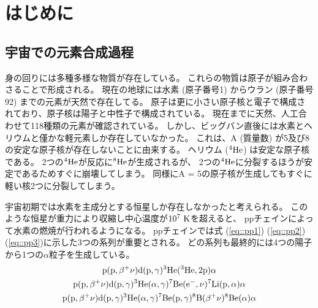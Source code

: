 \chapter{はじめに}
\section{宇宙での元素合成過程}
\label{seq::nucleaosynthesis}
身の回りには多種多様な物質が存在している。
これらの物質は原子が組み合わさることで形成される。
現在の地球には水素 (原子番号1) からウラン (原子番号92) までの元素が天然で存在してる。
原子は更に小さい原子核と電子で構成されており、原子核は陽子と中性子で構成されている。
現在までに天然、人工合わせて118種類の元素が確認されている。
しかし、ビッグバン直後には水素とヘリウムと僅かな軽元素しか存在していなかった。
これは、A (質量数) が5及び8の安定な原子核が存在しないことに由来する。
ヘリウム (${}^{4}\rm{He}$) は安定な原子核である。
2つの${}^{4}\rm{He}$が反応に${}^{8}\rm{He}$が生成されるが、
2つの${}^{4}\rm{He}$に分裂するほうが安定であるためすぐに崩壊してしまう。
同様にA = 5の原子核が生成してもすぐに軽い核2つに分裂してしまう。

宇宙初期では水素を主成分とする恒星しか存在しなかったと考えられる。
このような恒星が重力により収縮し中心温度が$10^7~\rm{K}$を超えると、
ppチェインによって水素の燃焼が行われるようになる。
ppチェインでは式 (\ref{eq::pp1}) (\ref{eq::pp2}) (\ref{eq::pp3})に示した3つの系列が重要とされる。
どの系列も最終的には4つの陽子から1つの$\alpha$粒子を生成している。
\begin{gather}
  \rm{p}(\rm{p},\beta^{+}\nu)\rm{d}(\rm{p},\gamma){}^{3}\rm{He}({}^{3}\rm{He},2\rm{p})\alpha\label{eq::pp1}\\
  \rm{p}(\rm{p},\beta^{+}\nu)\rm{d}(\rm{p},\gamma){}^{3}\rm{He}(\alpha,\gamma){}^{7}\rm{Be}(\rm{e}^{-},\nu){}^{7}\rm{Li}(\rm{p},\alpha)\alpha\label{eq::pp2}\\
  \rm{p}(\rm{p},\beta^{+}\nu)\rm{d}(\rm{p},\gamma){}^{3}\rm{He}(\alpha,\gamma){}^{7}\rm{Be}(\rm{p},\gamma){}^{8}\rm{B}(\beta^{+}\nu){}^{8}\rm{Be}(\alpha)\alpha\label{eq::pp3}
\end{gather}

